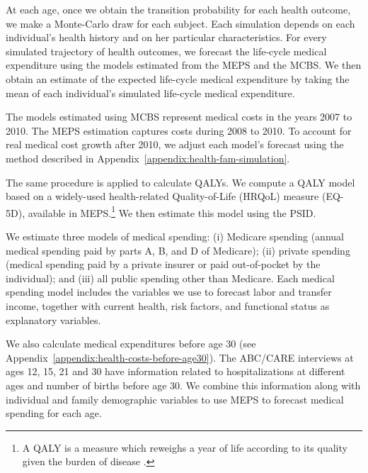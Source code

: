 At each age, once we obtain the transition probability for each health outcome, we make a Monte-Carlo draw for each subject. Each simulation depends on each individual's health history and on her particular characteristics. For every simulated trajectory of health outcomes, we forecast the life-cycle medical expenditure using the models estimated from the MEPS and the MCBS. We then obtain an estimate of the expected life-cycle medical expenditure by taking the mean of each individual's simulated life-cycle medical expenditure.

The models estimated using MCBS represent medical costs in the years 2007 to 2010. The MEPS estimation captures costs during 2008 to 2010. To account for real medical cost growth after 2010, we adjust each model's forecast using the method described in  Appendix~\ref{appendix:health-fam-simulation}.

The same procedure is applied to calculate QALYs. We compute a QALY model based on a widely-used health-related Quality-of-Life (HRQoL) measure (EQ-5D), available in MEPS.\footnote{A QALY is a measure which reweighs a year of life according to its quality given the burden of disease \citep{Dolan_1997_Modeling_MC,Shaw_etal_2005_EQ5D_MC}.} We then estimate this model using the PSID.

We estimate three models of medical spending: (i) Medicare spending (annual medical spending paid by parts A, B, and D of Medicare); (ii) private spending (medical spending paid by a private insurer or paid out-of-pocket by the individual); and (iii) all public spending other than Medicare. Each medical spending model includes the variables we use to forecast labor and transfer income, together with current health, risk factors, and functional status as explanatory variables.

We also calculate medical expenditures before age 30 (see Appendix~\ref{appendix:health-costs-before-age30}). The ABC/CARE interviews at ages 12, 15, 21 and 30 have information related to hospitalizations at different ages and number of births before age 30. We combine this information along with individual and family demographic variables to use MEPS to forecast medical spending for each age.

